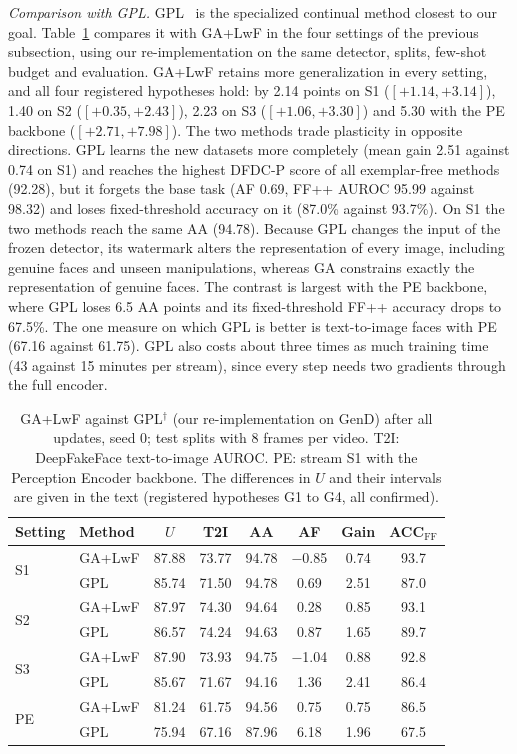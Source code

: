 \documentclass{ieeeaccess}
\newcommand{\ffpp}{FF{+}{+}}
\begin{document}
\textit{Comparison with GPL.}\label{sec:gpl} GPL~\cite{zhang2025gpl} is the specialized continual method closest to our goal. Table~\ref{tab:gpl} compares it with GA+LwF in the four settings of the previous subsection, using our re-implementation on the same detector, splits, few-shot budget and evaluation. GA+LwF retains more generalization in every setting, and all four registered hypotheses hold: by 2.14 points on S1 ($[+1.14,+3.14]$), 1.40 on S2 ($[+0.35,+2.43]$), 2.23 on S3 ($[+1.06,+3.30]$) and 5.30 with the PE backbone ($[+2.71,+7.98]$). The two methods trade plasticity in opposite directions. GPL learns the new datasets more completely (mean gain 2.51 against 0.74 on S1) and reaches the highest DFDC-P score of all exemplar-free methods (92.28), but it forgets the base task (AF 0.69, \ffpp{} AUROC 95.99 against 98.32) and loses fixed-threshold accuracy on it (87.0\% against 93.7\%). On S1 the two methods reach the same AA (94.78). Because GPL changes the input of the frozen detector, its watermark alters the representation of every image, including genuine faces and unseen manipulations, whereas GA constrains exactly the representation of genuine faces. The contrast is largest with the PE backbone, where GPL loses 6.5 AA points and its fixed-threshold \ffpp{} accuracy drops to 67.5\%. The one measure on which GPL is better is text-to-image faces with PE (67.16 against 61.75). GPL also costs about three times as much training time (43 against 15 minutes per stream), since every step needs two gradients through the full encoder.

\begin{table}[t]
\caption{GA+LwF against GPL$^\dagger$ (our re-implementation on GenD) after all updates, seed 0; test splits with 8 frames per video. T2I: DeepFakeFace text-to-image AUROC. PE: stream S1 with the Perception Encoder backbone. The differences in $U$ and their intervals are given in the text (registered hypotheses G1 to G4, all confirmed).}
\label{tab:gpl}
\centering
\footnotesize
\setlength{\tabcolsep}{3pt}
\begin{tabular}{@{}llcccccc@{}}
\toprule
Setting & Method & $U$ & T2I & AA & AF & Gain & ACC$_{\mathrm{FF}}$ \\
\midrule
\multirow{2}{*}{S1} & GA+LwF & 87.88 & 73.77 & 94.78 & $-$0.85 & 0.74 & 93.7 \\
 & GPL & 85.74 & 71.50 & 94.78 & 0.69 & 2.51 & 87.0 \\
\midrule
\multirow{2}{*}{S2} & GA+LwF & 87.97 & 74.30 & 94.64 & 0.28 & 0.85 & 93.1 \\
 & GPL & 86.57 & 74.24 & 94.63 & 0.87 & 1.65 & 89.7 \\
\midrule
\multirow{2}{*}{S3} & GA+LwF & 87.90 & 73.93 & 94.75 & $-$1.04 & 0.88 & 92.8 \\
 & GPL & 85.67 & 71.67 & 94.16 & 1.36 & 2.41 & 86.4 \\
\midrule
\multirow{2}{*}{PE} & GA+LwF & 81.24 & 61.75 & 94.56 & 0.75 & 0.75 & 86.5 \\
 & GPL & 75.94 & 67.16 & 87.96 & 6.18 & 1.96 & 67.5 \\
\bottomrule
\end{tabular}
\end{table}
\end{document}
